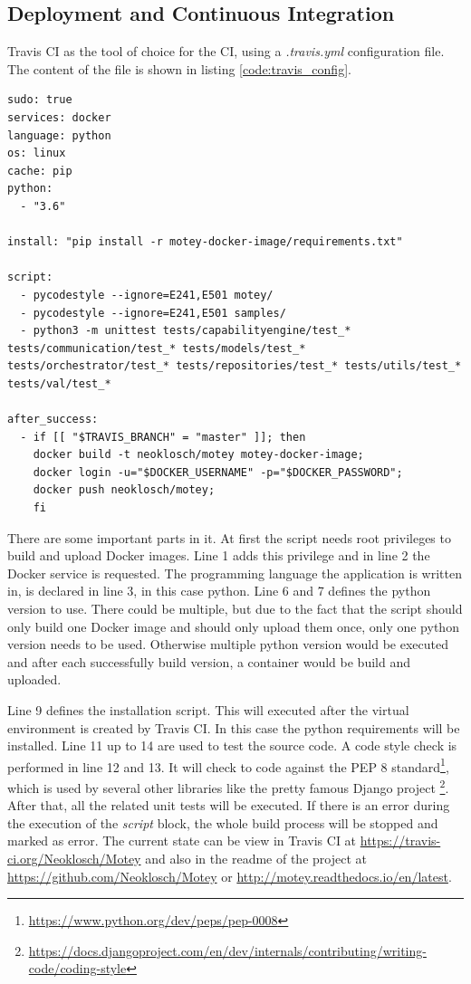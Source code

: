 \subsection{Deployment and Continuous Integration}
Travis CI as the tool of choice for the \ac{CI}, using a \textit{.travis.yml} configuration file.
The content of the file is shown in listing \ref{code:travis_config}.\newline

\begin{verbatim}
sudo: true
services: docker
language: python
os: linux
cache: pip
python:
  - "3.6"

install: "pip install -r motey-docker-image/requirements.txt"

script:
  - pycodestyle --ignore=E241,E501 motey/
  - pycodestyle --ignore=E241,E501 samples/
  - python3 -m unittest tests/capabilityengine/test_* tests/communication/test_* tests/models/test_* tests/orchestrator/test_* tests/repositories/test_* tests/utils/test_* tests/val/test_*

after_success:
  - if [[ "$TRAVIS_BRANCH" = "master" ]]; then
    docker build -t neoklosch/motey motey-docker-image;
    docker login -u="$DOCKER_USERNAME" -p="$DOCKER_PASSWORD";
    docker push neoklosch/motey;
    fi
\end{verbatim}
\vspace{0.5cm}

There are some important parts in it.
At first the script needs root privileges to build and upload Docker images.
Line 1 adds this privilege and in line 2 the Docker service is requested.
The programming language the application is written in, is declared in line 3, in this case python.
Line 6 and 7 defines the python version to use.
There could be multiple, but due to the fact that the script should only build one Docker image and should only upload them once, only one python version needs to be used.
Otherwise multiple python version would be executed and after each successfully build version, a container would be build and uploaded.\newline

Line 9 defines the installation script.
This will executed after the virtual environment is created by Travis CI.
In this case the python requirements will be installed.
Line 11 up to 14 are used to test the source code.
A code style check is performed in line 12 and 13.
It will check to code against the \ac{PEP} 8 standard\footnote{\url{https://www.python.org/dev/peps/pep-0008}}, which is used by several other libraries like the pretty famous Django project{ \footnote{\url{https://docs.djangoproject.com/en/dev/internals/contributing/writing-code/coding-style}}}.
After that, all the related unit tests will be executed.
If there is an error during the execution of the \textit{script} block, the whole build process will be stopped and marked as error.
The current state can be view in Travis CI at \url{https://travis-ci.org/Neoklosch/Motey} and also in the readme of the project at \url{https://github.com/Neoklosch/Motey} or \url{http://motey.readthedocs.io/en/latest}.\newline

